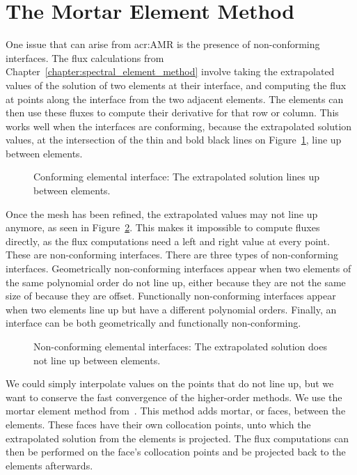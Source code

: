 \section{The Mortar Element Method}\label{section:adaptive_mesh_refinement:mortar_element_method}

One issue that can arise from \acrshort{acr:AMR} is the presence of non-conforming interfaces. The
flux calculations from Chapter~\ref{chapter:spectral_element_method} involve taking the extrapolated
values of the solution of two elements at their interface, and computing the flux at points along
the interface from the two adjacent elements. The elements can then use these fluxes to compute
their derivative for that row or column. This works well when the interfaces are conforming, because
the extrapolated solution values, at the intersection of the thin and bold black lines on
Figure~\ref{fig:conforming_interfaces}, line up between elements.

\begin{figure}[H]
	\centering
	
	\caption{Conforming elemental interface: The extrapolated solution lines up between elements.}\label{fig:conforming_interfaces}
\end{figure}

Once the mesh has been refined, the extrapolated values may not line up anymore, as seen in
Figure~\ref{fig:non_conforming_interfaces}. This makes it impossible to compute fluxes directly, as
the flux computations need a left and right value at every point. These are non-conforming
interfaces. There are three types of non-conforming interfaces. Geometrically non-conforming
interfaces appear when two elements of the same polynomial order do not line up, either because they
are not the same size of because they are offset. Functionally non-conforming interfaces appear when
two elements line up but have a different polynomial orders. Finally, an interface can be both
geometrically and functionally non-conforming.

\begin{figure}[H]
	\centering
	
	\caption{Non-conforming elemental interfaces: The extrapolated solution does not line up between elements.}\label{fig:non_conforming_interfaces}
\end{figure}

We could simply interpolate values on the points that do not line up, but we want to conserve the
fast convergence of the higher-order methods. We use the mortar element method
from~\cite{Maday1989}. This method adds mortar, or faces, between the elements. These faces have
their own collocation points, unto which the extrapolated solution from the elements is projected.
The flux computations can then be performed on the face's collocation points and be projected back
to the elements afterwards.

